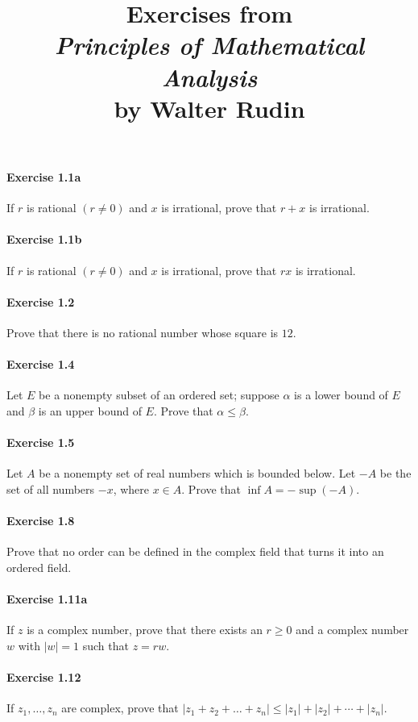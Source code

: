 \documentclass{article}
\title{\textbf{
Exercises from \\
\textit{Principles of Mathematical Analysis} \\
by Walter Rudin
}}
\date{}
\begin{document}
\maketitle

\paragraph{Exercise 1.1a} If $r$ is rational $(r \neq 0)$ and $x$ is irrational, prove that $r+x$ is irrational.

\paragraph{Exercise 1.1b} If $r$ is rational $(r \neq 0)$ and $x$ is irrational, prove that $rx$ is irrational.

\paragraph{Exercise 1.2} Prove that there is no rational number whose square is $12$.

\paragraph{Exercise 1.4} Let $E$ be a nonempty subset of an ordered set; suppose $\alpha$ is a lower bound of $E$ and $\beta$ is an upper bound of $E$. Prove that $\alpha \leq \beta$.

\paragraph{Exercise 1.5} Let $A$ be a nonempty set of real numbers which is bounded below. Let $-A$ be the set of all numbers $-x$, where $x \in A$. Prove that $\inf A=-\sup (-A)$.

\paragraph{Exercise 1.8} Prove that no order can be defined in the complex field that turns it into an ordered field.

\paragraph{Exercise 1.11a} If $z$ is a complex number, prove that there exists an $r\geq 0$ and a complex number $w$ with $| w | = 1$ such that $z = rw$.

\paragraph{Exercise 1.12} If $z_1, \ldots, z_n$ are complex, prove that $|z_1 + z_2 + \ldots + z_n| \leq |z_1| + |z_2| + \cdots + |z_n|$.
\end{document}
